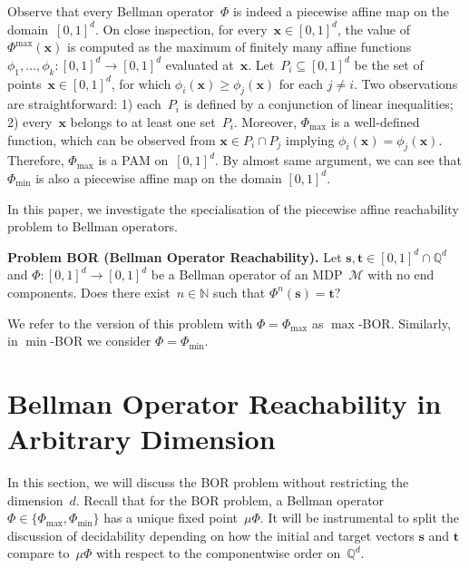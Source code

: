 \documentclass[preprint,12pt]{elsarticle}
\theoremstyle{plain}
\theoremstyle{definition}
\theoremstyle{remark}
\theoremstyle{claimstyle}
\newcommand{\mdp}{\mathcal{M}}
\newcommand{\QQ}{\mathbb{Q}}
\newcommand{\NN}{\mathbb{N}}
\begin{document}
Observe that every Bellman operator~$\Phi$
is indeed a piecewise affine map on the domain~$[0,1]^d$.
On close inspection, for every~$\bm{x} \in [0,1]^d$, the value of $\Phi^{\max}(\bm{x})$ is computed as the %
maximum of finitely many affine functions~$\phi_1, \dots, \phi_k : [0,1]^d \rightarrow [0,1]^d$ evaluated at~$\bm{x}$.
Let~$P_i \subseteq [0,1]^d$ be the set of points~$\bm{x} \in [0,1]^d$, for which %
$\phi_i(\bm{x}) \geq \phi_j(\bm{x})$ for each $j \neq i$.
Two observations are straightforward: 1) each~$P_i$ is defined by a conjunction of linear inequalities; 2) every~$\bm{x}$ belongs to at least one set~$P_i$.
Moreover, $\Phi_{\max}$ is a well-defined function,
which can be observed from $\bm{x} \in P_i \cap P_j$ implying $\phi_i(\bm{x}) = \phi_j(\bm{x})$.
Therefore, $\Phi_{\max}$ is a PAM on~$[0,1]^d$. By almost same argument, we can see that $\Phi_{\min}$ is also a piecewise affine map on the domain $[0,1]^d$.

In this paper, we investigate the specialisation of the piecewise affine reachability problem to Bellman operators.
\begin{mdframed}
\textbf{Problem BOR (Bellman Operator Reachability).}
Let $\bm{s}, \bm{t} \in [0,1]^d \cap \QQ^d$ and $\Phi: [0,1]^d \rightarrow [0,1]^d$ be a Bellman operator of an MDP~$\mdp$ with no end components. 
Does there exist~$n \in \NN$ such that $\Phi^n(\bm{s}) = \bm{t}?$
\end{mdframed}
We refer to the version of this problem with $\Phi = \Phi_{\max}$ as $\max$-BOR. Similarly, in $\min$-BOR we consider  $\Phi = \Phi_{\min}$.

\section{Bellman Operator Reachability in Arbitrary Dimension}
\label{sec:efs}
In this section, we will discuss the BOR problem without restricting the dimension~$d$.
Recall that for the BOR problem, a Bellman operator~$\Phi \in \{\Phi_{\max}, \Phi_{\min}\}$ has a unique fixed point~$\mu\Phi$.
It will be instrumental to split the discussion of decidability depending on
how the initial and target vectors $\bm{s}$ and $\bm{t}$ compare to~$\mu\Phi$ with respect to the componentwise order on~$\QQ^d$.
\end{document}
